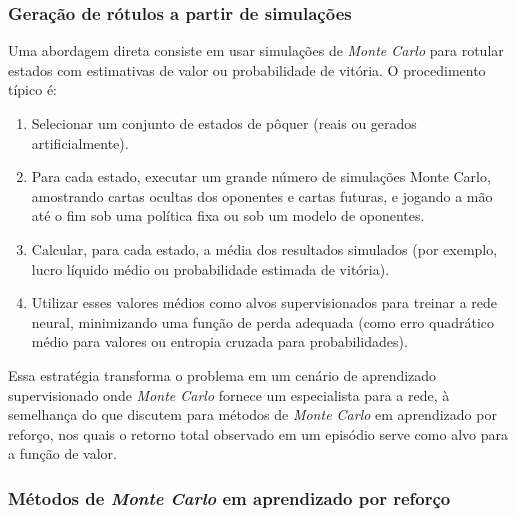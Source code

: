 \subsubsection{Geração de rótulos a partir de simulações}

Uma abordagem direta consiste em usar simulações de \textit{Monte Carlo} para rotular estados com estimativas de valor ou probabilidade de vitória. O procedimento típico é:
\begin{enumerate}
      \item Selecionar um conjunto de estados de pôquer (reais ou gerados artificialmente).
      \item Para cada estado, executar um grande número de simulações Monte Carlo, amostrando cartas ocultas dos oponentes e cartas futuras, e jogando a mão até o fim sob uma política fixa ou sob um modelo de oponentes.
      \item Calcular, para cada estado, a média dos resultados simulados (por exemplo, lucro líquido médio ou probabilidade estimada de vitória).
      \item Utilizar esses valores médios como alvos supervisionados para treinar a rede neural, minimizando uma função de perda adequada (como erro quadrático médio para valores ou entropia cruzada para probabilidades).
\end{enumerate}
Essa estratégia transforma o problema em um cenário de aprendizado supervisionado onde \textit{Monte Carlo} fornece um especialista para a rede, à semelhança do que  discutem para métodos de \textit{Monte Carlo} em aprendizado por reforço, nos quais o retorno total observado em um episódio serve como alvo para a função de valor.

\subsubsection{Métodos de \textit{Monte Carlo} em aprendizado por reforço}

